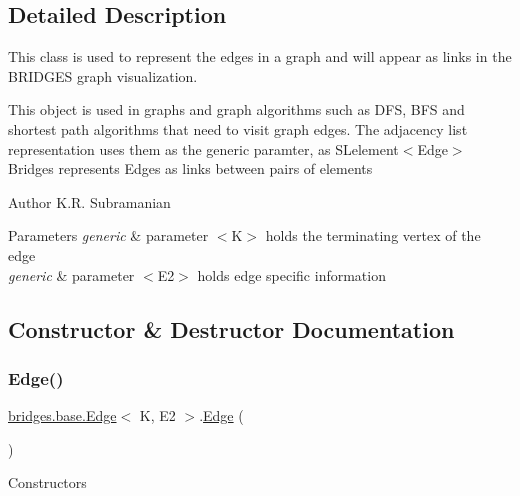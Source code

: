\subsection{Detailed Description}
This class is used to represent the edges in a graph and will appear as links in the B\+R\+I\+D\+G\+ES graph visualization. 

This object is used in graphs and graph algorithms such as D\+FS, B\+FS and shortest path algorithms that need to visit graph edges. The adjacency list representation uses them as the generic paramter, as S\+Lelement$<$\+Edge$>$ Bridges represents Edges as links between pairs of elements

\begin{DoxyAuthor}{Author}
K.\+R. Subramanian
\end{DoxyAuthor}

\begin{DoxyParams}{Parameters}
{\em generic} & parameter $<$\+K$>$ holds the terminating vertex of the edge \\
\hline
{\em generic} & parameter $<$\+E2$>$ holds edge specific information \\
\hline
\end{DoxyParams}


\subsection{Constructor \& Destructor Documentation}
\mbox{\label{classbridges_1_1base_1_1_edge_a7b1ff43c94076afdc1b9be4665eefb9b}} 
\subsubsection{\texorpdfstring{Edge()}{Edge()}\hspace{0.1cm}{\footnotesize\ttfamily [1/4]}}
{\footnotesize\ttfamily \mbox{\hyperlink{classbridges_1_1base_1_1_edge}{bridges.\+base.\+Edge}}$<$ K, E2 $>$.\mbox{\hyperlink{classbridges_1_1base_1_1_edge}{Edge}} (\begin{DoxyParamCaption}{ }\end{DoxyParamCaption})}

Constructors \mbox{\label{classbridges_1_1base_1_1_edge_a8e9a4fb99d91f481e29c3ab632063267}} 
